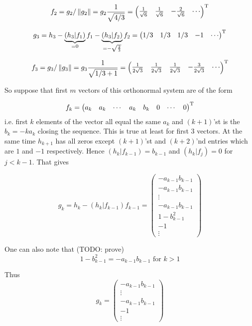 \documentclass{article}
\begin{document}
        $$f_2 = g_2/\left\|{g_2}\right\| =
g_2 \frac{1}{\sqrt{4/3}} =
\begin{pmatrix} \frac1{\sqrt6} & \frac1{\sqrt6} & - \frac2{\sqrt6} & \cdots \end{pmatrix}^{\mathrm{T}}$$

    $$g_3 =
h_3 - \underbrace{\left(h_3|f_1\right)}_{=0}f_1
    - \underbrace{\left(h_3|f_2\right)}_{=-\sqrt{\frac23}}f_2
= \begin{pmatrix} 1/3 & 1/3 & 1/3 & -1 & \cdots \end{pmatrix}^{\mathrm{T}}$$

    $$f_3 = g_3 / \left\|{g_3}\right\| = g_3 \frac{1}{\sqrt{1/3 + 1}} =
\begin{pmatrix}
    \frac{1}{2\sqrt3} & \frac{1}{2\sqrt3} &
    \frac{1}{2\sqrt3} & - \frac{3}{2\sqrt3} &
    \cdots
\end{pmatrix}^{\mathrm{T}}$$

So suppose that first $m$ vectors of this orthonormal system
are of the form

$$ f_k =
\begin{pmatrix}
    a_k & a_k & \cdots & a_k & b_k & 0 & \cdots & 0
\end{pmatrix}^{\mathrm{T}}$$
i.e. first $k$ elements of the vector all equal the same $a_k$
and $(k+1)$'st is the $b_k = -ka_k$ closing the sequence.
This is true at least for first 3 vectors.
At the same time $h_{k+1}$ has all zeros
except $(k+1)$'st and $(k+2)$'nd entries which are $1$ and $-1$ respectively.
Hence $\left(h_k|f_{k-1}\right) = b_{k-1}$ and $\left(h_k|f_j\right) = 0$ for $j < k-1$.
That gives

$$g_k = h_k - \left(h_k|f_{k-1}\right) f_{k-1} =
\begin{pmatrix}
    - a_{k-1} b_{k-1} \\
    - a_{k-1} b_{k-1} \\
    \vdots \\
    - a_{k-1} b_{k-1} \\
    1 - b_{k-1}^2     \\
    -1 \\
    \vdots
\end{pmatrix}$$

One can also note that (TODO: prove)
$$1 - b_{k-1}^2 = - a_{k-1} b_{k-1} \text{ for } k>1$$

Thus
$$g_k =
\begin{pmatrix}
    - a_{k-1} b_{k-1} \\
    \vdots \\
    - a_{k-1} b_{k-1} \\
    -1 \\
    \vdots
\end{pmatrix}$$
\end{document}
